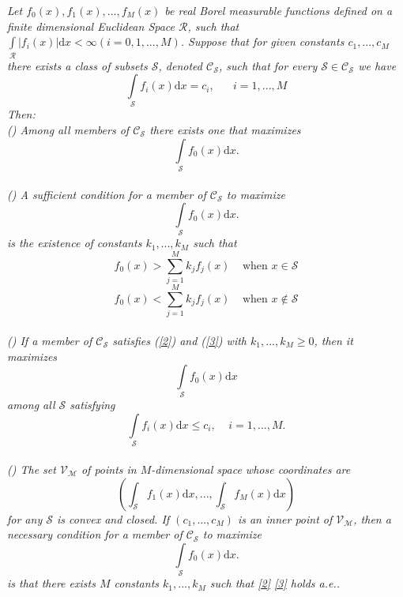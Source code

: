 \textit{
  Let $f_0(x), f_1(x), ..., f_{M}(x)$ be real Borel measurable functions  defined on a finite dimensional Euclidean Space $\mathcal{R}$, such that $\int \limits_\mathcal{R} | f_i(x)|\mathrm{d}x < \infty (i=0, 1,...,M)$.  Suppose that for given constants $c_1,...,c_M$ there exists a class of subsets $\mathcal{S}$, denoted $\mathcal{C}_\mathcal{S}$, such that for every $\mathcal{S} \in \mathcal{C}_\mathcal{S}$ we have
\begin{equation}
\label{one}
\int\limits_\mathcal{S} f_i(x)\mathrm{d}x = c_i, \;\;\;\;\;\;i=1,...,M
\end{equation}
Then:
\\\textnormal{()} Among all members of $\mathcal{C}_\mathcal{S}$ there exists one that maximizes
\[
\int \limits_\mathcal{S} f_{0}(x)\mathrm{d}x.
\]
\\\textnormal{()} A sufficient condition for a member of $\mathcal{C}_\mathcal{S}$ to maximize
\[
\int \limits_\mathcal{S} f_{0}(x)\mathrm{d}x.
\]
is the existence of constants $k_1,...,k_M$ such that
\begin{equation}
\label{2}
f_{0}(x)>\sum\limits_{j=1}^M k_j f_j(x)\;\;\;\;\text{when $x \in \mathcal{S}$}
\end{equation}
\begin{equation}
\label{3}
f_{0}(x)<\sum\limits_{j=1}^M k_j f_j(x)\;\;\;\;\text{when $x \notin \mathcal{S}$}
\end{equation}
\\\textnormal{()} If a member of $\mathcal{C}_\mathcal{S}$ satisfies  \textnormal{(\ref{2})} and \textnormal{(\ref{3})} with $k_1,...,k_M\geq0$, then it maximizes
\begin{equation}
\label{4}
\int \limits_\mathcal{S} f_{0}(x)\mathrm{d}x
\end{equation}
among all $\mathcal{S}$ satisfying
\begin{equation}
\label{5}
\int \limits_\mathcal{S} f_i(x)\mathrm{d}x\leq c_i,\;\;\;\;i=1,...,M.
\end{equation}
\\\textnormal{()} The set $\mathcal{V}_\mathcal{M}$ of points in $M$-dimensional space whose coordinates are 
\begin{equation}
(\int_{\mathcal{S}}f_1(x)\mathrm{d}x, ..., \int_{\mathcal{S}}f_M(x)\mathrm{d}x)
\end{equation}
for any $\mathcal{S}$ is convex and closed. If $(c_1, ..., c_M)$ is an inner point of $\mathcal{V}_\mathcal{M}$, then a  necessary condition for a member of $\mathcal{C}_\mathcal{S}$ to maximize 
\[
\int \limits_\mathcal{S} f_{0}(x)\mathrm{d}x.
\]
is that there exists $M$ constants $k_1, ..., k_M$ such that \eqref{2} \eqref{3} holds a.e..
}

